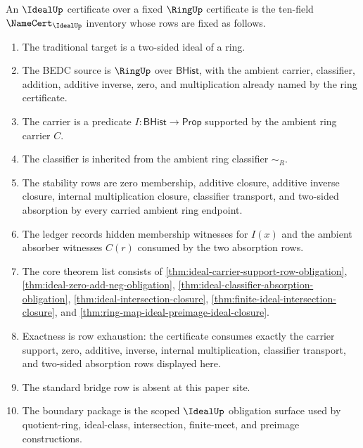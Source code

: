 \begin{definition}
\label{def:ideal-obligation-inventory}
An $\IdealUp$ certificate over a fixed $\RingUp$ certificate is the ten-field
$\NameCert_{\IdealUp}$ inventory whose rows are fixed as follows.
\begin{enumerate}
\item The traditional target is a two-sided ideal of a ring.
\item The BEDC source is $\RingUp$ over $\mathsf{BHist}$, with the ambient
carrier, classifier, addition, additive inverse, zero, and multiplication
already named by the ring certificate.
\item The carrier is a predicate $I:\mathsf{BHist}\to\mathsf{Prop}$ supported
by the ambient ring carrier $C$.
\item The classifier is inherited from the ambient ring classifier $\sim_R$.
\item The stability rows are zero membership, additive closure, additive
inverse closure, internal multiplication closure, classifier transport, and
two-sided absorption by every carried ambient ring endpoint.
\item The ledger records hidden membership witnesses for $I(x)$ and the
ambient absorber witnesses $C(r)$ consumed by the two absorption rows.
\item The core theorem list consists of
\autoref{thm:ideal-carrier-support-row-obligation},
\autoref{thm:ideal-zero-add-neg-obligation},
\autoref{thm:ideal-classifier-absorption-obligation},
\autoref{thm:ideal-intersection-closure},
\autoref{thm:finite-ideal-intersection-closure}, and
\autoref{thm:ring-map-ideal-preimage-ideal-closure}.
\item Exactness is row exhaustion: the certificate consumes exactly the carrier
support, zero, additive, inverse, internal multiplication, classifier
transport, and two-sided absorption rows displayed here.
\item The standard bridge row is absent at this paper site.
\item The boundary package is the scoped $\IdealUp$ obligation surface used by
quotient-ring, ideal-class, intersection, finite-meet, and preimage
constructions.
\end{enumerate}
\end{definition}

